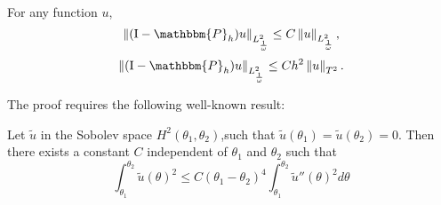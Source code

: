 \documentclass[a4paper]{article}
\begin{document}
\begin{Lem}
	For any function $u$, 
	\[\norm{(\textup{I} - \mathbbm{P}_h)u}_{L^2_\frac{1}{\omega}} \leq C\norm{u}_{L^{2}_\frac{1}{\omega}},\]
	\[\norm{(\textup{I} - \mathbbm{P}_h)u}_{L^2_\frac{1}{\omega}}  \leq C h^2 \norm{u}_{T^2}.\]
	\label{PhT0T2}
\end{Lem}
\noindent The proof requires the following well-known result:
\begin{Lem}
	\label{LemH2NulAuBord}
	Let $\tilde{u}$ in the Sobolev space $H^2(\theta_1,\theta_2)$,such that $\tilde{u}(\theta_1) = \tilde{u}(\theta_2) = 0$. Then there exists a constant $C$ independent of $\theta_1$ and $\theta_2$ such that 
	\[ \int_{\theta_1}^{\theta_2} \tilde{u}(\theta)^2 \leq C(\theta_1-\theta_2)^4 \int_{\theta_1}^{\theta_2} \tilde{u}''(\theta)^2 d\theta\]
\end{Lem}
\end{document}
